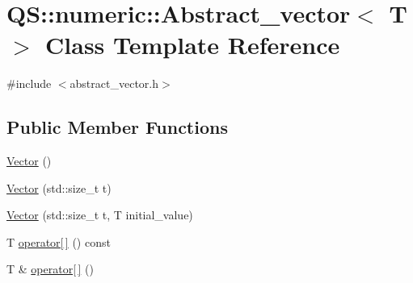 \hypertarget{classQS_1_1numeric_1_1Abstract__vector}{\section{Q\-S\-:\-:numeric\-:\-:Abstract\-\_\-vector$<$ T $>$ Class Template Reference}
\label{classQS_1_1numeric_1_1Abstract__vector}
}


{\ttfamily \#include $<$abstract\-\_\-vector.\-h$>$}

\subsection*{Public Member Functions}
\begin{DoxyCompactItemize}
\item 
\hyperlink{classQS_1_1numeric_1_1Abstract__vector_aae739efc9c12f4be44198287448b14f9}{Vector} ()
\item 
\hyperlink{classQS_1_1numeric_1_1Abstract__vector_a02d2223fe8c4d5b407affeed1ad6ef07}{Vector} (std\-::size\-\_\-t t)
\item 
\hyperlink{classQS_1_1numeric_1_1Abstract__vector_a759ec67623f45f8360d806577c0c3611}{Vector} (std\-::size\-\_\-t t, T initial\-\_\-value)
\item 
T \hyperlink{classQS_1_1numeric_1_1Abstract__vector_a32c5ffcecbf0cbf41191a43be0840c2c}{operator\mbox{[}$\,$\mbox{]}} () const 
\item 
T \& \hyperlink{classQS_1_1numeric_1_1Abstract__vector_a645fd5f416137757f92da799d7c27e36}{operator\mbox{[}$\,$\mbox{]}} ()
\end{DoxyCompactItemize}


